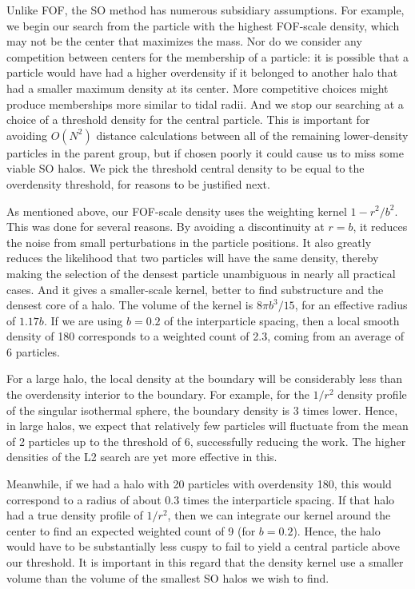Unlike FOF, the SO method has numerous subsidiary assumptions.  For
example, we begin our search from the particle with the highest
FOF-scale density, which may not be the center that maximizes the 
mass.  Nor do we consider any competition between centers for the
membership of a particle: it is possible that a particle would have
had a higher overdensity if it belonged to another halo that had
a smaller maximum density at its center.  More competitive choices
might produce memberships more similar to tidal radii.  And we stop
our searching at a choice of a threshold density for the central
particle.  This is important for avoiding $O(N^2)$ distance
calculations between all of the remaining lower-density particles 
in the parent group, but if chosen poorly it could cause us to 
miss some viable SO halos.  We pick the threshold central density
to be equal to the overdensity threshold, for reasons to be justified
next.

As mentioned above, our FOF-scale density uses the weighting kernel
$1-r^2/b^2$.  This was done for several reasons.  By avoiding a
discontinuity at $r=b$, it reduces the noise from small perturbations
in the particle positions.  It also greatly reduces the likelihood
that two particles will have the same density, thereby making the
selection of the densest particle unambiguous in nearly all practical
cases.  And it gives a smaller-scale kernel, better to find
substructure and the densest core of a halo.  The volume of the
kernel is $8\pi b^3/15$, for an effective radius of $1.17b$.  If
we are using $b=0.2$ of the interparticle spacing, then a local
smooth density of 180 corresponds to a weighted count of 2.3, coming
from an average of 6 particles.

For a large halo, the local density at the boundary will be
considerably less than the overdensity interior to the boundary.
For example, for the $1/r^2$ density profile of the singular
isothermal sphere, the boundary density is 3 times lower.  Hence,
in large halos, we expect that relatively few particles will
fluctuate from the mean of 2 particles up to the threshold of 6,
successfully reducing the work.  The higher densities of the L2
search are yet more effective in this.

Meanwhile, if we had a halo with 20 particles with overdensity 180,
this would correspond to a radius of about 0.3 times the interparticle
spacing.  If that halo had a true density profile of $1/r^2$, then
we can integrate our kernel around the center to find an expected
weighted count of 9 (for $b=0.2$).  Hence, the halo would have to
be substantially less cuspy to fail to yield a central particle
above our threshold.  It is important in this regard that the 
density kernel use a smaller volume than the volume of the smallest
SO halos we wish to find.

